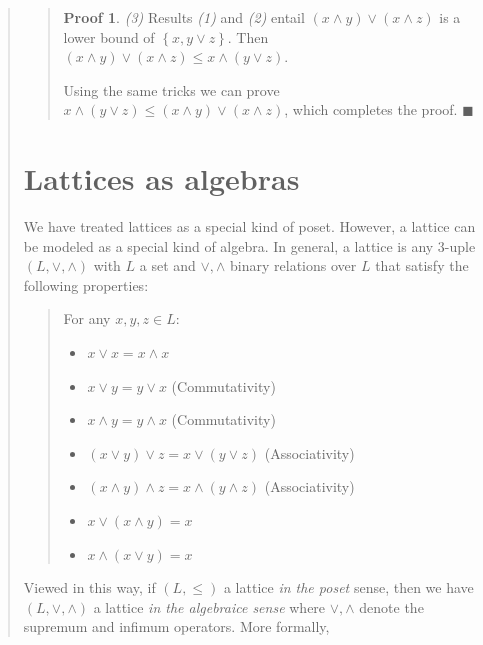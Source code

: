 \documentclass[a4paper, 12pt]{article}
\theoremstyle{definition}
\theoremstyle{definition}
\theoremstyle{definition}
\newtheorem{pro}{Proof}
\begin{document}
\begin{quote}
\begin{quote}
\begin{pro}
\textit{(3)} Results \textit{(1)} and \textit{(2)} entail $(x \land  y) \lor (x
\land  z)$ is a lower bound of $\left\{ x, y \lor  z \right\} $. Then $(x \land
y) \lor  (x \land  z) \leq x \land  (y \lor  z)$.

Using the same tricks we can prove $x \land  (y \lor  z) \leq (x \land  y) \lor
(x \land  z)$, which completes the proof. $\blacksquare$
    \end{pro}

\end{quote}
\normalsize


\pagebreak
{}
\section{Lattices as algebras}

We have treated lattices as a special kind of poset. However, a lattice can be
modeled as a special kind of algebra. In general, a lattice is any $3$-uple
$(L, \lor, \land)$ with $L$ a set and $\lor, \land$ binary relations over $L$
that satisfy the following properties: 


\small
\begin{quote}

    For any $x, y, z \in L$:

\begin{itemize}
    \item $x \lor x = x \land x$ 
    \item $x \lor y = y \lor x$ (Commutativity)
    \item $x \land y = y \land x$ (Commutativity)
    \item $(x \lor y) \lor z = x \lor (y \lor z)$ (Associativity)
    \item $(x \land y) \land z = x \land (y \land z)$ (Associativity)
    \item $x \lor (x \land y) = x $
    \item $x \land (x \lor y) = x$
\end{itemize}

\end{quote}
\normalsize

Viewed in this way, if $(L, \leq)$ a lattice \textit{in the poset} sense, then
we have $(L, \lor, \land)$ a lattice \textit{in the algebraice sense} where
$\lor, \land$ denote the supremum and infimum operators. More formally,


\end{quote}
\end{document}
